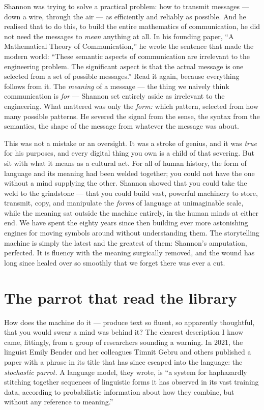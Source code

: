 Shannon was trying to solve a practical problem: how to transmit messages — down a wire, through the air — as efficiently and reliably as possible. And he realised that to do this, to build the entire mathematics of communication, he did not need the messages to \emph{mean} anything at all. In his founding paper, ``A Mathematical Theory of Communication,'' he wrote the sentence that made the modern world: ``These semantic aspects of communication are irrelevant to the engineering problem. The significant aspect is that the actual message is one selected from a set of possible messages.'' Read it again, because everything follows from it. The \emph{meaning} of a message — the thing we naively think communication is \emph{for} — Shannon set entirely aside as irrelevant to the engineering. What mattered was only the \emph{form:} which pattern, selected from how many possible patterns. He severed the signal from the sense, the syntax from the semantics, the shape of the message from whatever the message was about.

This was not a mistake or an oversight. It was a stroke of genius, and it was \emph{true} for his purposes, and every digital thing you own is a child of that severing. But sit with what it means as a cultural act. For all of human history, the form of language and its meaning had been welded together; you could not have the one without a mind supplying the other. Shannon showed that you could take the weld to the grindstone — that you could build vast, powerful machinery to store, transmit, copy, and manipulate the \emph{forms} of language at unimaginable scale, while the meaning sat outside the machine entirely, in the human minds at either end. We have spent the eighty years since then building ever more astonishing engines for moving symbols around without understanding them. The storytelling machine is simply the latest and the greatest of them: Shannon's amputation, perfected. It is fluency with the meaning surgically removed, and the wound has long since healed over so smoothly that we forget there was ever a cut.

\section*{The parrot that read the library}

How does the machine do it — produce text so fluent, so apparently thoughtful, that you would swear a mind was behind it? The clearest description I know came, fittingly, from a group of researchers sounding a warning. In 2021, the linguist Emily Bender and her colleagues Timnit Gebru and others published a paper with a phrase in its title that has since escaped into the language: the \emph{stochastic parrot.} A language model, they wrote, is ``a system for haphazardly stitching together sequences of linguistic forms it has observed in its vast training data, according to probabilistic information about how they combine, but without any reference to meaning.''

